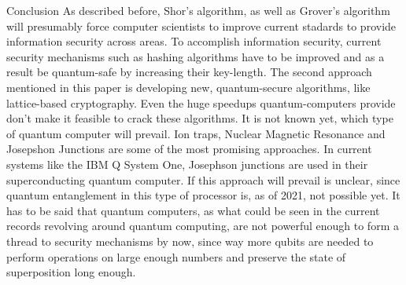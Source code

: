 \documentclass[aps,preprintnumbers,twocolumn]{revtex4}
\begin{document}
\begin{section}{Conclusion}
As described before, Shor's algorithm, 
as well as Grover's algorithm will presumably force computer scientists to improve current stadards to provide information security across areas. 
To accomplish information security, 
current security mechanisms such as hashing algorithms have to be improved and as a result be quantum-safe by increasing their key-length.
The second approach mentioned in this paper is developing new, 
quantum-secure algorithms, 
like lattice-based cryptography. 
Even the huge speedups quantum-computers provide don't make it feasible to crack these algorithms. 
It is not known yet, which type of quantum computer will prevail. 
Ion traps, Nuclear Magnetic Resonance and Josepshon Junctions are some of the most promising approaches. 
In current systems like the IBM Q System One, 
Josephson junctions are used in their superconducting quantum computer. 
If this approach will prevail is unclear, 
since quantum entanglement in this type of processor is, as of 2021, not possible yet. 
It has to be said that quantum computers, 
as what could be seen in the current records revolving around quantum computing, 
are not powerful enough to form a thread to security mechanisms by now, 
since way more qubits are needed to perform operations on large enough numbers and preserve the state of superposition long enough. 
\end{section}



\end{document}
